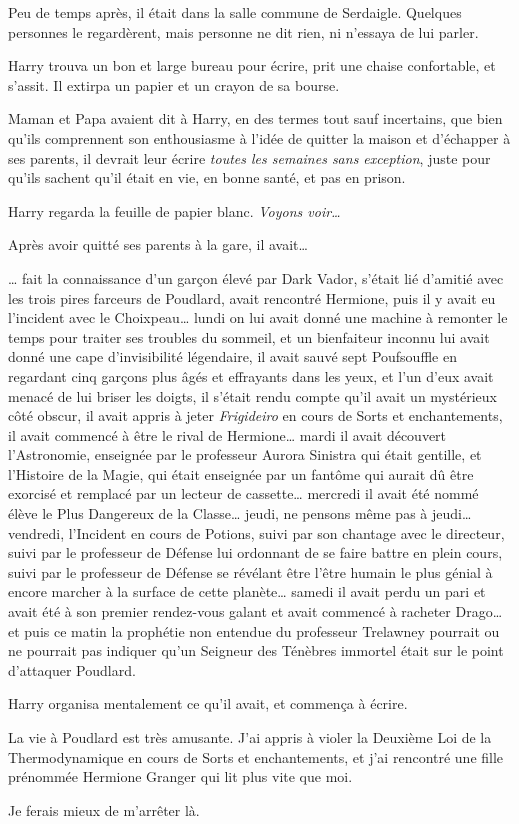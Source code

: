 Peu de temps après, il était dans la salle commune de Serdaigle.
Quelques personnes le regardèrent, mais personne ne dit rien, ni n'essaya de lui parler.

Harry trouva un bon et large bureau pour écrire, prit une chaise confortable, et s'assit.
Il extirpa un papier et un crayon de sa bourse.

Maman et Papa avaient dit à Harry, en des termes tout sauf incertains, que bien qu'ils comprennent son enthousiasme à l'idée de quitter la maison et d'échapper à ses parents, il devrait leur écrire \emph{toutes les semaines sans exception}, juste pour qu'ils sachent qu'il était en vie, en bonne santé, et pas en prison.

Harry regarda la feuille de papier blanc.
\emph{Voyons voir…}

Après avoir quitté ses parents à la gare, il avait…

… fait la connaissance d'un garçon élevé par Dark Vador, s'était lié d'amitié avec les trois pires farceurs de Poudlard, avait rencontré Hermione, puis il y avait eu l'incident avec le Choixpeau… lundi on lui avait donné une machine à remonter le temps pour traiter ses troubles du sommeil, et un bienfaiteur inconnu lui avait donné une cape d'invisibilité légendaire, il avait sauvé sept Poufsouffle en regardant cinq garçons plus âgés et effrayants dans les yeux, et l'un d'eux avait menacé de lui briser les doigts, il s'était rendu compte qu'il avait un mystérieux côté obscur, il avait appris à jeter \emph{Frigideiro} en cours de Sorts et enchantements, il avait commencé à être le rival de Hermione… mardi il avait découvert l'Astronomie, enseignée par le professeur Aurora Sinistra qui était gentille, et l'Histoire de la Magie, qui était enseignée par un fantôme qui aurait dû être exorcisé et remplacé par un lecteur de cassette… mercredi il avait été nommé élève le Plus Dangereux de la Classe… jeudi, ne pensons même pas à jeudi… vendredi, l'Incident en cours de Potions, suivi par son chantage avec le directeur, suivi par le professeur de Défense lui ordonnant de se faire battre en plein cours, suivi par le professeur de Défense se révélant être l'être humain le plus génial à encore marcher à la surface de cette planète… samedi il avait perdu un pari et avait été à son premier rendez-vous galant et avait commencé à racheter Drago… et puis ce matin la prophétie non entendue du professeur Trelawney pourrait ou ne pourrait pas indiquer qu'un Seigneur des Ténèbres immortel était sur le point d'attaquer Poudlard.

Harry organisa mentalement ce qu'il avait, et commença à écrire.
\begin{writtenNote}

La vie à Poudlard est très amusante.
J'ai appris à violer la Deuxième Loi de la Thermodynamique en cours de Sorts et enchantements, et j'ai rencontré une fille prénommée Hermione Granger qui lit plus vite que moi.

Je ferais mieux de m'arrêter là.

\end{writtenNote}

